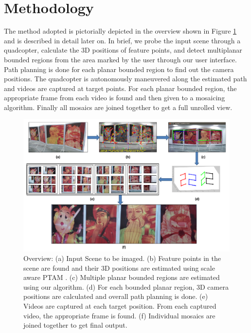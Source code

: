 



\section{Methodology}
The method adopted is pictorially depicted in the overview shown in Figure
\ref{fig:workflow} and is described in detail later on. In brief, we probe the
input scene through a quadcopter, calculate the 3D positions of feature points,
and detect multiplanar bounded regions from the area marked by the user through
our user interface. Path planning is done for each planar bounded region to find out
the camera positions. The quadcopter is autonomously maneuvered along the
estimated path and videos are captured at target points. For each planar
bounded region, the appropriate frame from each video is found and then given
to a mosaicing algorithm.  Finally all mosaics are joined together to get a full
unrolled view.

\begin{figure}[ht!]
\centering
\includegraphics[width=\textwidth]{figures/multiplanar/workflow}
\caption[Overall Workflow]{Overview: (a) Input Scene to be imaged. (b) Feature
points in the scene are found and their 3D positions are estimated using scale aware PTAM \cite{engel}. (c) Multiple planar bounded
regions are estimated using our algorithm. (d) For each bounded planar region, 3D camera positions
are calculated and overall path planning is done. (e) Videos are captured at
each target position. From each captured video, the appropriate frame is
found. (f) Individual mosaics are joined together to get final output.}
\label{fig:workflow}
\end{figure}
